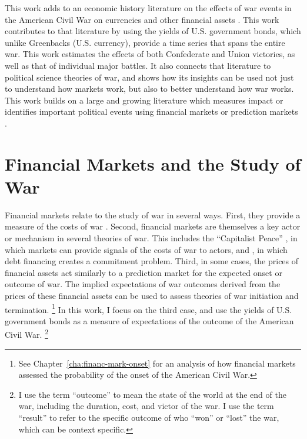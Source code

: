 This work adds to an economic history literature on the effects of war events in the American Civil War on currencies and other financial assets \parencites{Mitchell1903}{Mitchell1908}{Schwab1901}{Roll1972}{Calomiris1988}{DavisPecquet1990}{WillardGuinnaneEtAl1996}{McCandless1996}{SmithSmith1997}{BrownBurdekin2000}{Weidenmier2000}{Weidenmier2002}{HaberMitchenerOosterlinckEtAl2014}.
This work contributes to that literature by using the yields of U.S. government bonds, which unlike Greenbacks (U.S. currency), provide a time series that spans the entire war. 
This work estimates the effects of both Confederate and Union victories, as well as that of individual major battles.
It also connects that  literature to political science theories of war, and shows how its insights can be used not just to understand how markets work, but also to better understand how war works.
This work builds on a large and growing literature which measures impact or identifies important political events using financial markets \parencites{NorthWeingast1989}{north2000introd}{FreyKucher2000}{sussman2000instit}{wells2000revol}{Herron2000}{eldor2004finan}{ChenSiems2004}{Greenstone2007} or prediction markets \parencites{WolfersZitzewitz2004}{ArrowForsytheGorhamEtAl2008}{WolfersZitzewitz2009}.



\section{Financial Markets and the Study of War}
\label{sec:barg-theory-war}

Financial markets relate to the study of war in several ways.
First, they provide a measure of the costs of war \parencites{SchneiderTroeger2006}{GuidolinLaFerrara2010}.
Second, financial markets are themselves a key actor or mechanism in several theories of war.
This includes the ``Capitalist Peace'' \parencites{Gartzke2007}{DafoeKelsey2014a}, in which markets can provide signals of the costs of war to actors, and \textcite{Slantchev2012a}, in which debt financing creates a commitment problem.
Third, in some cases, the prices of financial assets act similarly to a prediction market for the expected onset or outcome of war.
The implied expectations of war outcomes  derived from the prices of these financial assets can be used to assess theories of war initiation and termination.%
\footnote{See Chapter~\ref{cha:financ-mark-onset} for an analysis of how financial markets assessed the probability of the onset of the American Civil War.}
In this work, I focus on the third case, and use the yields of U.S. government bonds as a measure of expectations of the outcome of the American Civil War.%
\footnote{
  I use the term ``outcome'' to mean the state of the world at the end of the war, including the duration, cost, and victor of the war.
  I use the term ``result'' to refer to the specific outcome of who ``won'' or ``lost'' the war, which can be context specific.
}

